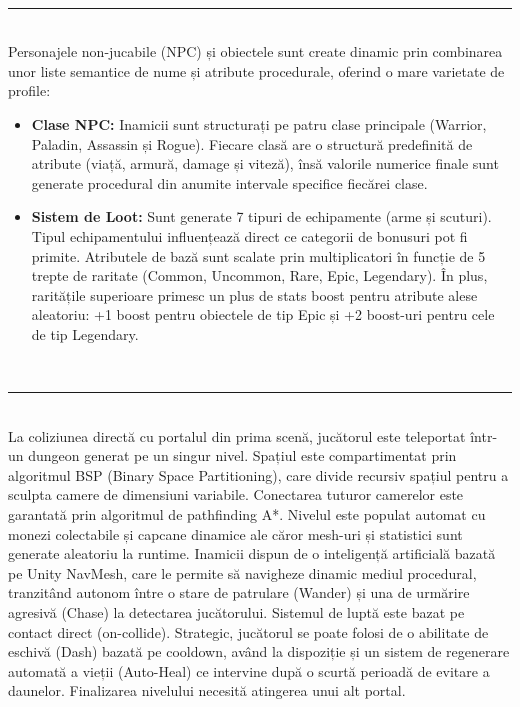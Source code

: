 \documentclass[11pt,a4paper]{article}
\begin{document}
\vspace{0.4cm}
 \\
\rule{\textwidth}{0.8pt} \\
Personajele non-jucabile (NPC) și obiectele sunt create dinamic prin combinarea unor liste semantice de nume și atribute procedurale, oferind o mare varietate de profile:
\begin{itemize}[itemsep=2pt, topsep=2pt, parsep=0pt, leftmargin=*]
    \item \textbf{Clase NPC:} Inamicii sunt structurați pe patru clase principale (Warrior, Paladin, Assassin și Rogue). Fiecare clasă are o structură predefinită de atribute (viață, armură, damage și viteză), însă valorile numerice finale sunt generate procedural din anumite intervale specifice fiecărei clase.
    \item \textbf{Sistem de Loot:} Sunt generate 7 tipuri de echipamente (arme și scuturi). Tipul echipamentului influențează direct ce categorii de bonusuri pot fi primite. Atributele de bază sunt scalate prin multiplicatori în funcție de 5 trepte de raritate (Common, Uncommon, Rare, Epic, Legendary). În plus, raritățile superioare primesc un plus de stats boost pentru atribute alese aleatoriu: +1 boost pentru obiectele de tip Epic și +2 boost-uri pentru cele de tip Legendary.
\end{itemize}


\vspace{0.4cm}
 \\
\rule{\textwidth}{0.8pt} \\
La coliziunea directă cu portalul din prima scenă, jucătorul este teleportat într-un dungeon generat pe un singur nivel. Spațiul este compartimentat prin algoritmul BSP (Binary Space Partitioning), care divide recursiv spațiul pentru a sculpta camere de dimensiuni variabile. Conectarea tuturor camerelor este garantată prin algoritmul de pathfinding A*. Nivelul este populat automat cu monezi colectabile și capcane dinamice ale căror mesh-uri și statistici sunt generate aleatoriu la runtime. Inamicii dispun de o inteligență artificială bazată pe Unity NavMesh, care le permite să navigheze dinamic mediul procedural, tranzitând autonom între o stare de patrulare (Wander) și una de urmărire agresivă (Chase) la detectarea jucătorului. Sistemul de luptă este bazat pe contact direct (on-collide). Strategic, jucătorul se poate folosi de o abilitate de eschivă (Dash) bazată pe cooldown, având la dispoziție și un sistem de regenerare automată a vieții (Auto-Heal) ce intervine după o scurtă perioadă de evitare a daunelor. Finalizarea nivelului necesită atingerea unui alt portal.
\\[1.5cm]
\end{document}
